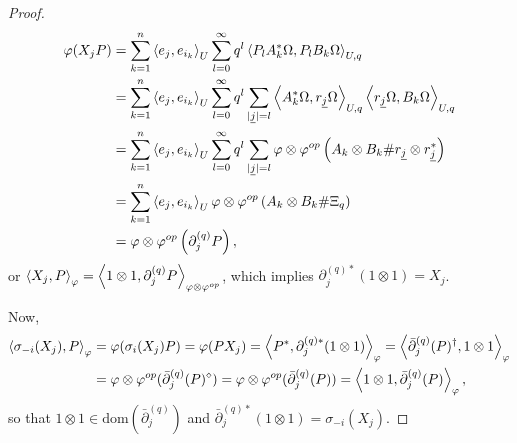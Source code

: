 \begin{proof}
	\begin{align*}
		\varphi(X_jP) &= \sum_{k=1}^n \left\langle e_j, e_{i_k}\right\rangle_{U}\sum_{l=0}^\infty q^l \left\langle P_l A_k^*\Omega, P_l B_k\Omega\right\rangle_{U,q}\\
			&= \sum_{k=1}^n \left\langle e_j, e_{i_k}\right\rangle_U \sum_{l=0}^\infty q^l \sum_{|\underline{j}|=l}\left\langle A_k^*\Omega, r_{\underline{j}}\Omega\right\rangle_{U,q}\left\langle r_{\underline{j}}\Omega, B_k\Omega\right\rangle_{U,q}\\
			&= \sum_{k=1}^n \left\langle e_j, e_{i_k}\right\rangle_U \sum_{l=0}^\infty q^l \sum_{|\underline{j}|=l} \varphi\otimes\varphi^{op}\left( A_k\otimes B_k \# r_{\underline{j}}\otimes r_{\underline{j}}^* \right)\\
			&= \sum_{k=1}^n \left\langle e_j, e_{i_k}\right\rangle_U \varphi\otimes \varphi^{op}\left( A_k\otimes B_k \#\Xi_q\right) \\
			&= \varphi\otimes \varphi^{op}\left( \partial_j^{(q)}P \right),
	\end{align*}
or $\left\langle X_j, P\right\rangle_{\varphi} = \left\langle 1\otimes 1, \partial_j^{(q)}P\right\rangle_{\varphi\otimes\varphi^{op}}$, which implies $\partial_j^{(q)*}(1\otimes 1)=X_j$.\par
Now,
	\begin{align*}
		\left\langle\sigma_{-i}(X_j),P\right\rangle_{\varphi}&=\varphi(\sigma_i(X_j)P)=\varphi(PX_j)=\left\langle P^*,\partial_j^{(q)*}(1\otimes 1)\right\rangle_{\varphi}=\left\langle\bar{\partial}_j^{(q)}(P)^\dagger,1\otimes 1\right\rangle_{\varphi}\\
			&=\varphi\otimes\varphi^{op}( \bar{\partial}_j^{(q)}(P)^\diamond)=\varphi\otimes\varphi^{op}(\bar{\partial}_j^{(q)}(P))=\left\langle1\otimes 1, \bar{\partial}_j^{(q)}(P)\right\rangle_{\varphi},
	\end{align*}
so that $1\otimes 1\in \text{dom}\left(\bar{\partial}_j^{(q)}\right)$ and $\bar{\partial}_j^{(q)*}(1\otimes 1)=\sigma_{-i}(X_j)$.
\end{proof}

